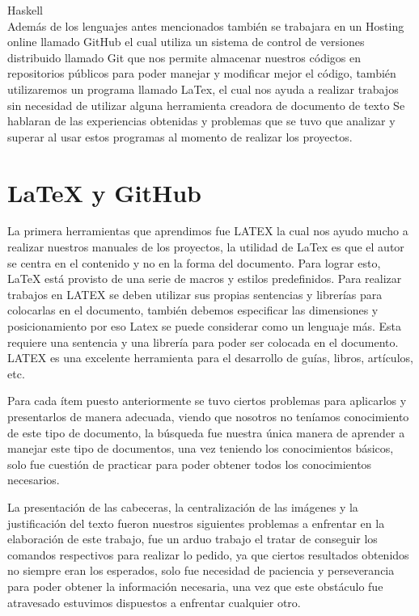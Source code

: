\documentclass[12pt]{extbook}
\begin{document}
\textbullet{} Haskell\\
Además de los lenguajes antes mencionados también se trabajara en un Hosting online llamado GitHub el cual utiliza  un sistema de control de versiones distribuido llamado Git que nos permite almacenar nuestros códigos en repositorios públicos para poder manejar y modificar mejor el código, también utilizaremos un programa llamado LaTex, el cual nos ayuda a realizar trabajos sin necesidad de utilizar alguna herramienta creadora de documento de texto
 Se hablaran de las experiencias obtenidas y problemas que se tuvo que analizar y superar al  usar estos programas al momento de realizar los proyectos.

\chapter{\LaTeX{} y GitHub}
La primera herramientas que aprendimos fue LATEX la cual nos ayudo mucho a realizar nuestros manuales de los proyectos, la utilidad de LaTex es que el autor se centra en el contenido y no en la forma del documento. Para lograr esto, LaTeX está provisto de una serie de macros y estilos predefinidos.  Para realizar trabajos en LATEX se deben utilizar sus propias sentencias y librerías para colocarlas en el documento, también debemos especificar las dimensiones y posicionamiento por eso Latex se puede considerar como un lenguaje más. Esta requiere una sentencia y una librería para poder ser colocada en el documento.
 LATEX es una excelente herramienta para el  desarrollo de guías, libros, artículos, etc.


Para cada ítem puesto anteriormente se tuvo ciertos problemas para aplicarlos y presentarlos de manera adecuada, viendo que nosotros no teníamos conocimiento de este tipo de documento, la búsqueda fue nuestra única manera de aprender a manejar este tipo de documentos, una vez teniendo los conocimientos básicos, solo fue cuestión de practicar para poder obtener todos los conocimientos necesarios.


La presentación de las cabeceras, la centralización de las imágenes y la justificación del texto fueron nuestros siguientes problemas a enfrentar en la elaboración de este trabajo, fue un arduo trabajo el tratar de conseguir los comandos respectivos para realizar lo pedido, ya que ciertos resultados obtenidos no siempre eran los esperados, solo fue necesidad de paciencia y perseverancia para poder obtener la información necesaria, una vez que este obstáculo fue atravesado estuvimos dispuestos a enfrentar cualquier otro.
\end{document}
